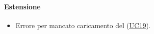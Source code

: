 \paragraph*{Estensione}
\begin{itemize}
  \item Errore per mancato caricamento del  (\hyperref[UC19]{UC19}).
\end{itemize}